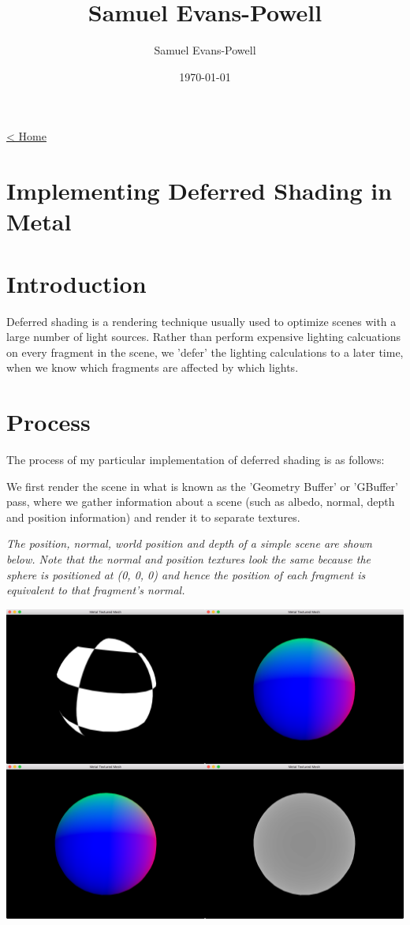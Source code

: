 \documentclass[11pt]{article}
\author{Samuel Evans-Powell}
\date{\today}
\title{Samuel Evans-Powell}
\begin{document}
\maketitle
\label{orgd5ea0e3}
\href{../index.org}{< Home}

\section*{Implementing Deferred Shading in Metal}
\label{sec:org5827193}

\setcounter{tocdepth}{4}
\tableofcontents

\section*{Introduction}
\label{sec:orgfce96dd}

Deferred shading is a rendering technique usually used to optimize scenes with
a large number of light sources. Rather than perform expensive lighting
calcuations on every fragment in the scene, we 'defer' the lighting
calculations to a later time, when we know which fragments are affected by which
lights.

\section*{Process}
\label{sec:orgefad57a}

The process of my particular implementation of deferred shading is as follows:

We first render the scene in what is known as the 'Geometry Buffer' or 'GBuffer'
pass, where we gather information about a scene (such as albedo, normal, depth 
and position information) and render it to separate textures.

\emph{The position, normal, world position and depth of a simple scene are shown below. Note that the normal and position textures look the same because the sphere is positioned at (0, 0, 0) and hence the position of each fragment is equivalent to that fragment's normal.}


\begin{center}
\includegraphics[width=.9\linewidth]{../img/posts/implementing-deferred-shading-in-metal/gbuffer-data.png}
\end{center}
\end{document}
